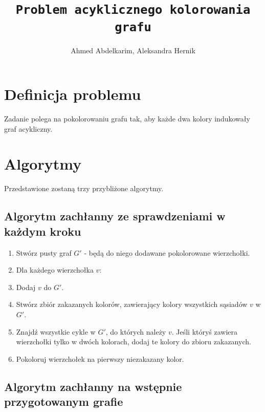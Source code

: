 \documentclass{article}
\title{\texttt{Problem acyklicznego kolorowania grafu}}
\author{Ahmed Abdelkarim, Aleksandra Hernik}
\begin{document}
\maketitle
\section{Definicja problemu}
Zadanie polega na pokolorowaniu grafu tak, aby każde dwa kolory indukowały graf acykliczny. 
\section{Algorytmy}
Przedstawione zostaną trzy przybliżone algorytmy.
\subsection{Algorytm zachłanny ze sprawdzeniami w każdym kroku}
\begin{enumerate}
\item Stwórz pusty graf $G'$ - będą do niego dodawane pokolorowane wierzchołki.
\item Dla każdego wierzchołka $v$:
\item Dodaj $v$ do $G'$.
\item Stwórz zbiór zakazanych kolorów, zawierający kolory wszystkich sąsiadów $v$ w $G'$.
\item Znajdź wszystkie cykle w $G'$, do których należy $v$. Jeśli któryś zawiera wierzchołki tylko w dwóch kolorach, dodaj te kolory do zbioru zakazanych.
\item Pokoloruj wierzchołek na pierwszy niezakazany kolor.
  
\end{enumerate}
\subsection{Algorytm zachłanny na wstępnie przygotowanym grafie}
\end{document}
